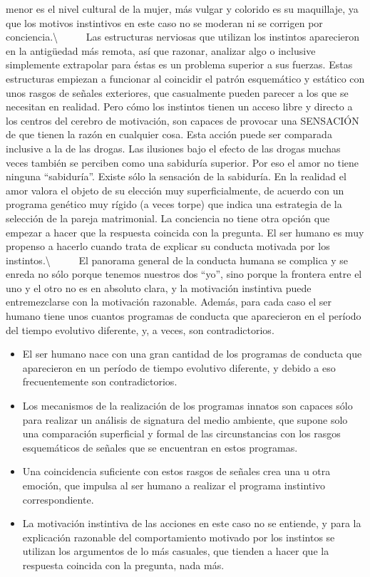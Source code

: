 menor es el nivel cultural de la mujer, más vulgar y colorido es su
maquillaje, ya que los motivos instintivos en este caso no se moderan ni
se corrigen por conciencia.\textbackslash{} ~ ~ ~ Las estructuras
nerviosas que utilizan los instintos aparecieron en la antigüedad más
remota, así que razonar, analizar algo o inclusive simplemente
extrapolar para éstas es un problema superior a sus fuerzas. Estas
estructuras empiezan a funcionar al coincidir el patrón esquemático y
estático con unos rasgos de señales exteriores, que casualmente pueden
parecer a los que se necesitan en realidad. Pero cómo los instintos
tienen un acceso libre y directo a los centros del cerebro de
motivación, son capaces de provocar una SENSACIÓN de que tienen la razón
en cualquier cosa. Esta acción puede ser comparada inclusive a la de las
drogas. Las ilusiones bajo el efecto de las drogas muchas veces también
se perciben como una sabiduría superior. Por eso el amor no tiene
ninguna ``sabiduría''. Existe sólo la sensación de la sabiduría. En la
realidad el amor valora el objeto de su elección muy superficialmente,
de acuerdo con un programa genético muy rígido (a veces torpe) que
indica una estrategia de la selección de la pareja matrimonial. La
conciencia no tiene otra opción que empezar a hacer que la respuesta
coincida con la pregunta. El ser humano es muy propenso a hacerlo cuando
trata de explicar su conducta motivada por los
instintos.\textbackslash{} ~ ~ ~ El panorama general de la conducta
humana se complica y se enreda no sólo porque tenemos nuestros dos
``yo'', sino porque la frontera entre el uno y el otro no es en absoluto
clara, y la motivación instintiva puede entremezclarse con la motivación
razonable. Además, para cada caso el ser humano tiene unos cuantos
programas de conducta que aparecieron en el período del tiempo evolutivo
diferente, y, a veces, son contradictorios.

\begin{itemize}
\tightlist
\item
  El ser humano nace con una gran cantidad de los programas de conducta
  que aparecieron en un período de tiempo evolutivo diferente, y debido
  a eso frecuentemente son contradictorios.
\item
  Los mecanismos de la realización de los programas innatos son capaces
  sólo para realizar un análisis de signatura del medio ambiente, que
  supone solo una comparación superficial y formal de las circunstancias
  con los rasgos esquemáticos de señales que se encuentran en estos
  programas.
\item
  Una coincidencia suficiente con estos rasgos de señales crea una u
  otra emoción, que impulsa al ser humano a realizar el programa
  instintivo correspondiente.
\item
  La motivación instintiva de las acciones en este caso no se entiende,
  y para la explicación razonable del comportamiento motivado por los
  instintos se utilizan los argumentos de lo más casuales, que tienden a
  hacer que la respuesta coincida con la pregunta, nada más.
\end{itemize}

